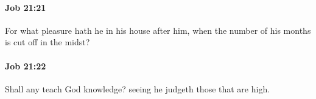 		\paragraph{Job 21:21} %
			\label{JOB-21-21}

			For what pleasure hath he in his house after him, when the number of his months is cut off in the midst?


		\paragraph{Job 21:22} %
			\label{JOB-21-22}

			Shall any teach God knowledge? seeing he judgeth those that are high.


